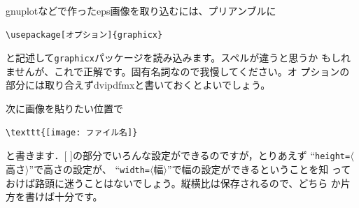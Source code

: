 gnuplotなどで作ったeps画像を取り込むには、プリアンブルに
\begin{screen}
\begin{verbatim}
\usepackage[オプション]{graphicx}
\end{verbatim}
\end{screen}
と記述して\verb+graphicx+パッケージを読み込みます。スペルが違うと思うか
もしれませんが、これで正解です。固有名詞なので我慢してください。オ
プションの部分には取り合えずdvipdfmxと書いておくとよいでしょう。

次に画像を貼りたい位置で
\begin{screen}
\begin{verbatim}
\texttt{[image: ファイル名]}
\end{verbatim}
\end{screen}
と書きます．[ ]の部分でいろんな設定ができるのですが，とりあえず
``\verb+height=+\mbox{$\langle$}高さ\mbox{$\rangle$}''で高さの設定が、
``\verb+width=+\mbox{$\langle$}幅\mbox{$\rangle$}''で幅の設定ができるということを知
っておけば路頭に迷うことはないでしょう。縦横比は保存されるので、どちら
か片方を書けば十分です。

